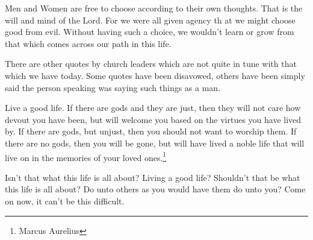 Men and Women are free to choose according to their own thoughts. That is the 
will and mind of the Lord. For we were all given agency th at we might choose 
good from evil. Without having such a choice, we wouldn't learn or grow from 
that which comes across our path in this life.

There are other quotes by church leaders which are not quite in tune with that 
which we have today. Some quotes have been disavowed, others have been simply 
said the person speaking was saying such things as a man.

\begin{displayquote}
Live a good life. If there are gods and they are just, then they will not care 
how devout you have been, but will welcome you based on the virtues you have 
lived by. If there are gods, but unjust, then you should not want to worship 
them. If there are no gods, then you will be gone, but will have lived a noble 
life that will live on in the memories of your loved ones.\footnote{
Marcus Aurelius}
\end{displayquote}

Isn't that what this life is all about? Living a good life? Shouldn't that be
what this life is all about? Do unto others as you would have them do unto you?
Come on now, it can't be this difficult.